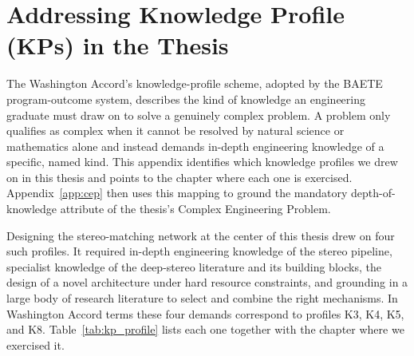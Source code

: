 \clearpage
\chapter{Addressing Knowledge Profile (KPs) in the Thesis}
\label{app:kp}

The Washington Accord's knowledge-profile scheme, adopted by the BAETE
program-outcome system, describes the kind of knowledge an engineering
graduate must draw on to solve a genuinely complex problem. A problem
only qualifies as complex when it cannot be resolved by natural
science or mathematics alone and instead demands in-depth engineering
knowledge of a specific, named kind. This appendix identifies which
knowledge profiles we drew on in this thesis and points to the chapter
where each one is exercised. Appendix~\ref{app:cep} then uses this
mapping to ground the mandatory depth-of-knowledge attribute of the
thesis's Complex Engineering Problem.

Designing the stereo-matching network at the center of this thesis
drew on four such profiles. It required in-depth engineering knowledge
of the stereo pipeline, specialist knowledge of the deep-stereo
literature and its building blocks, the design of a novel architecture
under hard resource constraints, and grounding in a large body of
research literature to select and combine the right mechanisms. In
Washington Accord terms these four demands correspond to profiles K3,
K4, K5, and K8. Table~\ref{tab:kp_profile} lists each one together
with the chapter where we exercised it.

